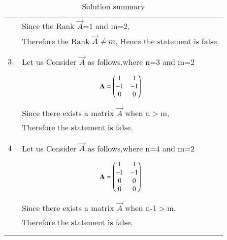 \documentclass[journal,12pt]{IEEEtran}
\begin{document}
\begin{longtable}{|l|l|}
&Since the Rank  $\vec{A}$=1 and m=2,\\
&Therefore the Rank $\vec{A} \neq m$, Hence the statement is false.\\
&\\
\hline
&\\
3.&Let us Consider $\vec{A}$ as follows,where n=3 and m=2\\
&\parbox{6cm}{\begin{align}
    \mathbf{A}=\begin{pmatrix}1&1\\-1&-1\\0&0\end{pmatrix}
\end{align}}\\
&Since there exists a matrix $\vec{A}$ when n$>$m,\\
&Therefore the statement is false.\\
&\\
\hline
&\\
4&Let us Consider $\vec{A}$ as follows,where n=4 and m=2\\
&\parbox{6cm}{\begin{align}
    \mathbf{A}=\begin{pmatrix}1&1\\-1&-1\\0&0\\0&0\end{pmatrix}
\end{align}}\\
&Since there exists a matrix $\vec{A}$ when n-1$>$m,\\
&Therefore the statement is false.\\
&\\
\hline
\caption{Solution summary}
\label{table:2}
\end{longtable}
\end{document}
